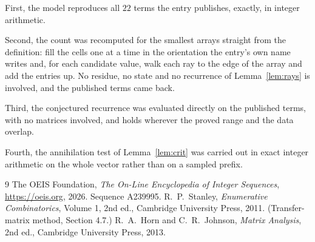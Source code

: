 \documentclass[11pt,a4paper]{article}
\theoremstyle{plain}
\theoremstyle{definition}
\begin{document}
First, the model reproduces all $22$ terms the entry publishes, exactly, in integer
arithmetic.

Second, the count was recomputed for the smallest arrays straight from the definition: fill the
cells one at a time in the orientation the entry's own name writes and, for each candidate
value, walk each ray to the edge of the array and add the entries up. No residue, no state and
no recurrence of Lemma~\ref{lem:rays} is involved, and the published terms came back.

Third, the conjectured recurrence was evaluated directly on the published terms, with no
matrices involved, and holds wherever the proved range and the data overlap.

Fourth, the annihilation test of Lemma~\ref{lem:crit} was carried out in exact integer
arithmetic on the whole vector rather than on a sampled prefix.

\begin{thebibliography}{9}
 The OEIS Foundation, \emph{The On-Line Encyclopedia of Integer
Sequences}, \url{https://oeis.org}, 2026. Sequence A239995.
 R.~P.~Stanley, \emph{Enumerative Combinatorics}, Volume 1, 2nd ed.,
Cambridge University Press, 2011. (Transfer-matrix method, Section 4.7.)
 R.~A.~Horn and C.~R.~Johnson, \emph{Matrix Analysis}, 2nd ed., Cambridge
University Press, 2013.
\end{thebibliography}
\end{document}
